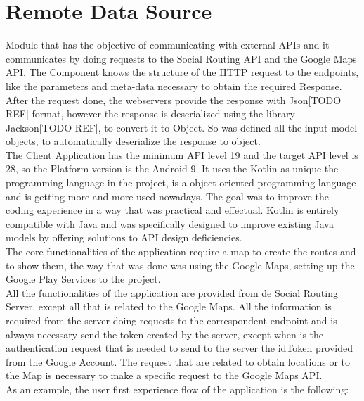 \section*{Remote Data Source}
Module that has the objective of communicating with external APIs and it communicates by doing requests to the Social Routing API and the Google Maps API. 
The Component knows the structure of the HTTP request to the endpoints, like the parameters and meta-data necessary to obtain the required Response.
After the request done, the webservers provide the response with Json[TODO REF] format, however the response is deserialized using the library Jackson[TODO REF],
to convert it to Object. So was defined all the input model objects, to automatically deserialize the response to object.\\

The Client Application has the minimum API level 19 and the target API level is 28, so the Platform version is the Android 9.
It uses the Kotlin as unique the programming language in the project, is a object oriented programming language and is getting more and more used nowadays. 
The goal was to improve the coding experience in a way that was practical and effectual. Kotlin is entirely compatible with Java and was specifically designed
to improve existing Java models by offering solutions to API design deficiencies. \\
The core functionalities of the application require a map to create the routes and to show them, the way that was done was using the Google Maps, setting up the 
Google Play Services to the project.\\
All the functionalities of the application are provided from de Social Routing Server, except all that is related to the Google Maps. All the information is required from the server doing
requests to the correspondent endpoint and is always necessary send the token created by the server, except when is the authentication request that is needed to send to the server the idToken
provided from the Google Account. The request that are related to obtain locations or to the Map is necessary to make a specific request to the Google Maps API. \\
As an example, the user first experience flow of the application is the following:

